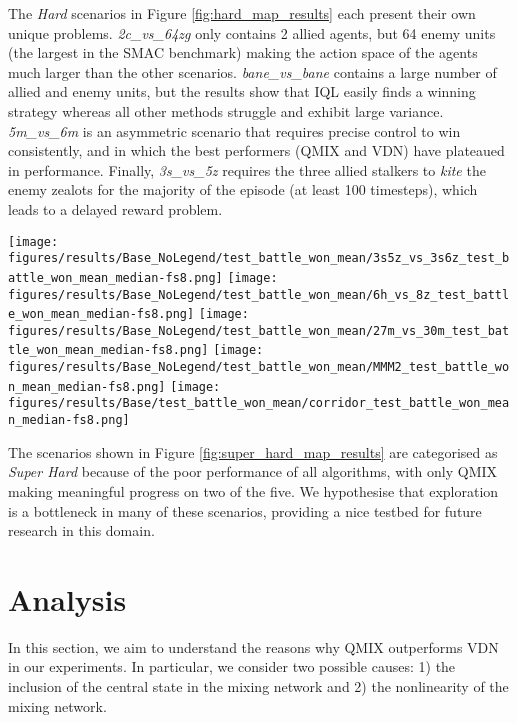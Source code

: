 \documentclass[twoside,11pt]{article}
\begin{document}
The \textit{Hard} scenarios in Figure \ref{fig:hard_map_results} each present their own unique problems.
\textit{2c\_vs\_64zg} only contains 2 allied agents, but 64 enemy units (the largest in the SMAC benchmark) making the action space of the agents much larger than the other scenarios.
\textit{bane\_vs\_bane} contains a large number of allied and enemy units, but the results show that IQL easily finds a winning strategy whereas all other methods struggle and exhibit large variance.
\textit{5m\_vs\_6m} is an asymmetric scenario that requires precise control to win consistently, and in which the best performers (QMIX and VDN) have plateaued in performance.
Finally, \textit{3s\_vs\_5z} requires the three allied stalkers to \textit{kite} the enemy zealots for the majority of the episode (at least 100 timesteps), which leads to a delayed reward problem.

\begin{figure*}[h!]
	\centering
	\texttt{[image: figures/results/Base\_NoLegend/test\_battle\_won\_mean/3s5z\_vs\_3s6z\_test\_battle\_won\_mean\_median-fs8.png]}
	\texttt{[image: figures/results/Base\_NoLegend/test\_battle\_won\_mean/6h\_vs\_8z\_test\_battle\_won\_mean\_median-fs8.png]}
	\texttt{[image: figures/results/Base\_NoLegend/test\_battle\_won\_mean/27m\_vs\_30m\_test\_battle\_won\_mean\_median-fs8.png]}
	\texttt{[image: figures/results/Base\_NoLegend/test\_battle\_won\_mean/MMM2\_test\_battle\_won\_mean\_median-fs8.png]}
	\texttt{[image: figures/results/Base/test\_battle\_won\_mean/corridor\_test\_battle\_won\_mean\_median-fs8.png]}
	\caption{Super Hard scenarios. The heuristic AI's performance shown as a dotted black line.}
	\label{fig:super_hard_map_results}
\end{figure*}

The scenarios shown in Figure \ref{fig:super_hard_map_results} are categorised as \textit{Super Hard} because of the poor performance of all algorithms, with
only QMIX  making meaningful progress on two of the five.
We hypothesise that exploration is a bottleneck in many of these scenarios, providing a nice testbed for future research in this domain.



 \section{Analysis}
\label{sec:analysis}



In this section, we aim to understand the reasons why QMIX outperforms VDN in 
our experiments. In particular, we consider two possible causes: 1) the 
inclusion of the central state in the mixing network and 2) the nonlinearity of 
the mixing network.
\end{document}
